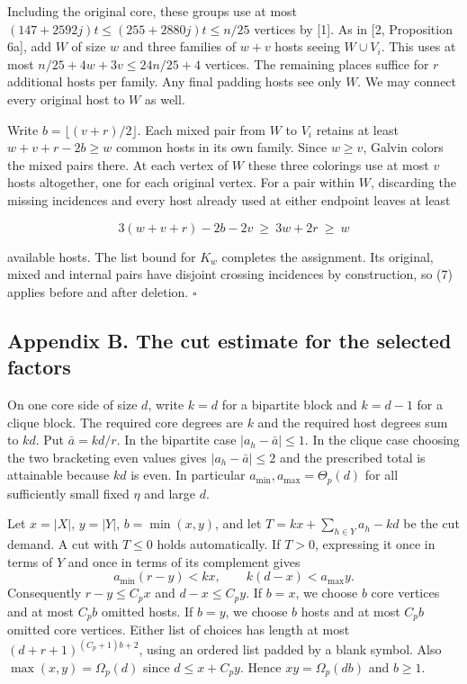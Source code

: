 \documentclass[english,11pt,a4paper]{article}
\begin{document}
Including the original core, these groups use at most \((147+2592j)t\le(255+2880j)t\le n/25\) vertices by {[}1{]}. As in {[}2, Proposition 6a{]}, add \(W\) of size \(w\) and three families of \(w+v\) hosts seeing \(W\cup V_i\). This uses at most \(n/25+4w+3v\le24n/25+4\) vertices. The remaining places suffice for \(r\) additional hosts per family. Any final padding hosts see only \(W\). We may connect every original host to \(W\) as well.

Write \(b=\lfloor(v+r)/2\rfloor\). Each mixed pair from \(W\) to \(V_i\) retains at least \(w+v+r-2b\ge w\) common hosts in its own family. Since \(w\ge v\), Galvin colors the mixed pairs there. At each vertex of \(W\) these three colorings use at most \(v\) hosts altogether, one for each original vertex. For a pair within \(W\), discarding the missing incidences and every host already used at either endpoint leaves at least

\[3(w+v+r)-2b-2v\ \ge\ 3w+2r\ \ge\ w\]

available hosts. The list bound for \(K_w\) completes the assignment. Its original, mixed and internal pairs have disjoint crossing incidences by construction, so (7) applies before and after deletion. \(\square\)

\subsection{Appendix B. The cut estimate for the selected factors}\label{appendix-b.-the-cut-estimate-for-the-selected-factors}

On one core side of size \(d\), write \(k=d\) for a bipartite block and \(k=d-1\) for a clique block. The required core degrees are \(k\) and the required host degrees sum to \(kd\). Put \(\bar a=kd/r\). In the bipartite case \(|a_h-\bar a|\le1\). In the clique case choosing the two bracketing even values gives \(|a_h-\bar a|\le2\) and the prescribed total is attainable because \(kd\) is even. In particular \(a_{\min},a_{\max}=\Theta_p(d)\) for all sufficiently small fixed \(\eta\) and large \(d\).

Let \(x=|X|\), \(y=|Y|\), \(b=\min(x,y)\), and let \(T=kx+\sum_{h\in Y}a_h-kd\) be the cut demand. A cut with \(T\le0\) holds automatically. If \(T>0\), expressing it once in terms of \(Y\) and once in terms of its complement gives \[a_{\min}(r-y)<kx,\qquad k(d-x)<a_{\max}y .\] Consequently \(r-y\le C_px\) and \(d-x\le C_py\). If \(b=x\), we choose \(b\) core vertices and at most \(C_pb\) omitted hosts. If \(b=y\), we choose \(b\) hosts and at most \(C_pb\) omitted core vertices. Either list of choices has length at most \((d+r+1)^{(C_p+1)b+2}\), using an ordered list padded by a blank symbol. Also \(\max(x,y)=\Omega_p(d)\) since \(d\le x+C_py\). Hence \(xy=\Omega_p(db)\) and \(b\ge1\).
\end{document}
